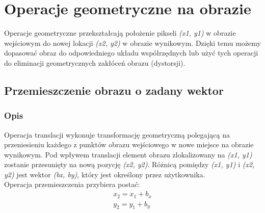 \documentclass[a4paper,12pt]{book}
\begin{document}
\chapter{Operacje geometryczne na obrazie}
Operacje geometryczne przekształcają położenie pikseli \textit{(x1, y1)} w obrazie wejściowym do nowej lokacji \textit{(x2, y2)} w obrazie wynikowym. Dzięki temu możemy dopasować obraz do odpowiedniego układu współrzędnych lub użyć tych operacji do eliminacji geometrycznych zakłóceń obrazu (dystorsji). 

\section{Przemieszczenie obrazu o zadany wektor}
\subsection*{Opis}
Operacja translacji wykonuje transformację geometryczną polegającą na przeniesieniu każdego z punktów obrazu wejściowego w nowe miejsce na obrazie wynikowym. Pod wpływem translacji element obrazu zlokalizowany na \textit{(x1, y1)} zostanie przesunięty na nową pozycję \textit{(x2, y2)}. Różnicą pomiędzy \textit{(x1, y1)} i \textit{(x2, y2)} jest wektor \textit{(bx, by)}, który jest określony przez użytkownika. \\
Operacja przemieszczenia przybiera postać: 
\begin{gather}
	x_2 = x_1 + b_x \\
	y_2 = y_1 + b_y
\end{gather}
\end{document}
